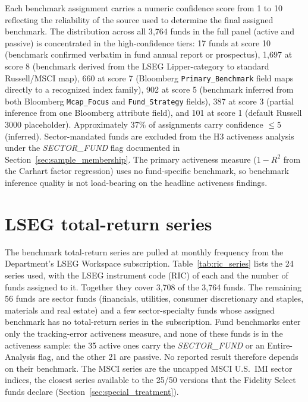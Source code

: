 \documentclass[12pt, oneside]{report}
\newcommand{\flag}[1]{\textit{#1}}
\begin{document}
\noindent Each benchmark assignment carries a numeric confidence
score from 1 to 10 reflecting the reliability of the source used
to determine the final assigned benchmark. The distribution across
all 3{,}764 funds in the full panel (active and passive) is
concentrated in the high-confidence tiers: 17 funds at score 10
(benchmark confirmed verbatim in fund annual report or prospectus),
1{,}697 at score 8 (benchmark derived from the LSEG Lipper-category
to standard Russell/MSCI map), 660 at score 7 (Bloomberg
\texttt{Primary\_Benchmark} field maps directly to a recognized
index family), 902 at score 5 (benchmark inferred from both
Bloomberg \texttt{Mcap\_Focus} and \texttt{Fund\_Strategy} fields),
387 at score 3 (partial inference from one Bloomberg attribute
field), and 101 at score 1 (default Russell 3000 placeholder).
Approximately 37\% of assignments carry confidence $\leq 5$
(inferred). Sector-mandated funds are excluded from the H3
activeness analysis under the \flag{SECTOR\_FUND} flag documented
in Section~\ref{sec:sample_membership}. The primary activeness
measure ($1-R^2$ from the Carhart factor regression) uses no
fund-specific benchmark, so benchmark inference quality is not
load-bearing on the headline activeness findings.

\section{LSEG total-return series}
\label{sec:ric_codes}

\noindent The benchmark total-return series are pulled at monthly
frequency from the Department's LSEG Workspace subscription.
Table~\ref{tab:ric_series} lists the 24 series used, with the LSEG
instrument code (RIC) of each and the number of funds assigned to it.
Together they cover 3{,}708 of the 3{,}764 funds. The remaining 56 funds
are sector funds (financials, utilities, consumer discretionary and
staples, materials and real estate) and a few sector-specialty funds
whose assigned benchmark has no total-return series in the
subscription. Fund benchmarks enter only the tracking-error activeness
measure, and none of these funds is in the activeness sample: the 35
active ones carry the \flag{SECTOR\_FUND} or an Entire-Analysis flag, and
the other 21 are passive. No reported result therefore depends on their
benchmark. The MSCI series are
the uncapped MSCI U.S.\ IMI sector indices, the closest series available
to the 25/50 versions that the Fidelity Select funds declare
(Section~\ref{sec:special_treatment}).
\end{document}
